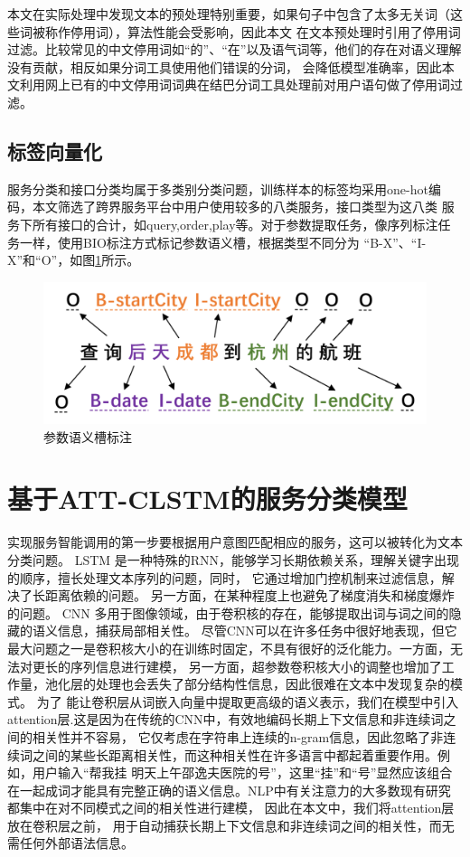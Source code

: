 本文在实际处理中发现文本的预处理特别重要，如果句子中包含了太多无关词（这些词被称作停用词），算法性能会受影响，因此本文
在文本预处理时引用了停用词过滤。比较常见的中文停用词如“的”、“在”以及语气词等，他们的存在对语义理解没有贡献，相反如果分词工具使用他们错误的分词，
会降低模型准确率，因此本文利用网上已有的中文停用词词典在结巴分词工具处理前对用户语句做了停用词过滤。

\subsection{标签向量化}
服务分类和接口分类均属于多类别分类问题，训练样本的标签均采用one-hot编码，本文筛选了跨界服务平台中用户使用较多的八类服务，接口类型为这八类
服务下所有接口的合计，如query,order,play等。对于参数提取任务，像序列标注任务一样，使用BIO标注方式标记参数语义槽，根据类型不同分为
“B-X”、“I-X”和“O”，如图\ref{fig:yuyicao}所示。
\begin{figure}[htbp]
  \centering
  \includegraphics[scale=0.5]{./images/yuyicao.png}
  \caption{参数语义槽标注}
  \label{fig:yuyicao}
\end{figure}


\section{基于ATT-CLSTM的服务分类模型}
实现服务智能调用的第一步要根据用户意图匹配相应的服务，这可以被转化为文本分类问题。
LSTM
是一种特殊的RNN，能够学习长期依赖关系，理解关键字出现的顺序，擅长处理文本序列的问题，同时，
它通过增加门控机制来过滤信息，解决了长距离依赖的问题。 另一方面，在某种程度上也避免了梯度消失和梯度爆炸的问题。
CNN
多用于图像领域，由于卷积核的存在，能够提取出词与词之间的隐藏的语义信息，捕获局部相关性。
尽管CNN可以在许多任务中很好地表现，但它最大问题之一是卷积核大小的在训练时固定，不具有很好的泛化能力。一方面，无法对更长的序列信息进行建模，
另一方面，超参数卷积核大小的调整也增加了工作量，池化层的处理也会丢失了部分结构性信息，因此很难在文本中发现复杂的模式。
为了
能让卷积层从词嵌入向量中提取更高级的语义表示，我们在模型中引入attention层.这是因为在传统的CNN中，有效地编码长期上下文信息和非连续词之间的相关性并不容易，
它仅考虑在字符串上连续的n-gram信息，因此忽略了非连续词之间的某些长距离相关性，而这种相关性在许多语言中都起着重要作用。例如，用户输入“帮我挂
明天上午邵逸夫医院的号”，这里“挂”和“号”显然应该组合在一起成词才能具有完整正确的语义信息。NLP中有关注意力的大多数现有研究都集中在对不同模式之间的相关性进行建模，
因此在本文中，我们将attention层放在卷积层之前，
用于自动捕获长期上下文信息和非连续词之间的相关性，而无需任何外部语法信息。

